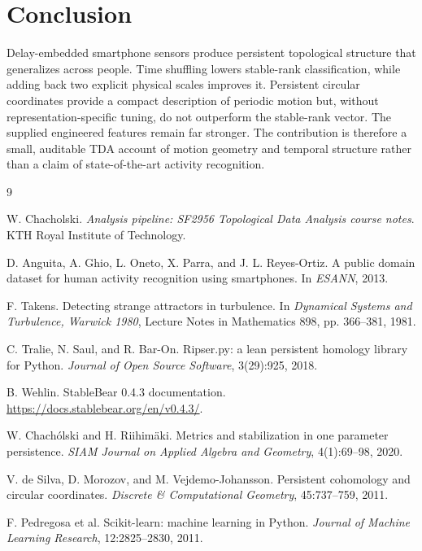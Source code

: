 \documentclass[11pt,a4paper]{article}
\begin{document}
\section{Conclusion}

Delay-embedded smartphone sensors produce persistent topological structure that generalizes across people. Time shuffling lowers stable-rank classification, while adding back two explicit physical scales improves it. Persistent circular coordinates provide a compact description of periodic motion but, without representation-specific tuning, do not outperform the stable-rank vector. The supplied engineered features remain far stronger. The contribution is therefore a small, auditable TDA account of motion geometry and temporal structure rather than a claim of state-of-the-art activity recognition.

\begingroup
\footnotesize
\begin{thebibliography}{9}
\setlength{\itemsep}{0.15em}
\setlength{\parskip}{0pt}

W. Chacholski.
\newblock \emph{Analysis pipeline: SF2956 Topological Data Analysis course notes}.
\newblock KTH Royal Institute of Technology.

D. Anguita, A. Ghio, L. Oneto, X. Parra, and J. L. Reyes-Ortiz.
\newblock A public domain dataset for human activity recognition using smartphones.
\newblock In \emph{ESANN}, 2013.

F. Takens.
\newblock Detecting strange attractors in turbulence.
\newblock In \emph{Dynamical Systems and Turbulence, Warwick 1980}, Lecture Notes in Mathematics 898, pp. 366--381, 1981.

C. Tralie, N. Saul, and R. Bar-On.
\newblock Ripser.py: a lean persistent homology library for Python.
\newblock \emph{Journal of Open Source Software}, 3(29):925, 2018.

B. Wehlin.
\newblock StableBear 0.4.3 documentation.
\newblock \url{https://docs.stablebear.org/en/v0.4.3/}.

W. Chach\'olski and H. Riihim\"aki.
\newblock Metrics and stabilization in one parameter persistence.
\newblock \emph{SIAM Journal on Applied Algebra and Geometry}, 4(1):69--98, 2020.

V. de Silva, D. Morozov, and M. Vejdemo-Johansson.
\newblock Persistent cohomology and circular coordinates.
\newblock \emph{Discrete \& Computational Geometry}, 45:737--759, 2011.

F. Pedregosa et al.
\newblock Scikit-learn: machine learning in Python.
\newblock \emph{Journal of Machine Learning Research}, 12:2825--2830, 2011.

\end{thebibliography}
\endgroup
\end{document}
